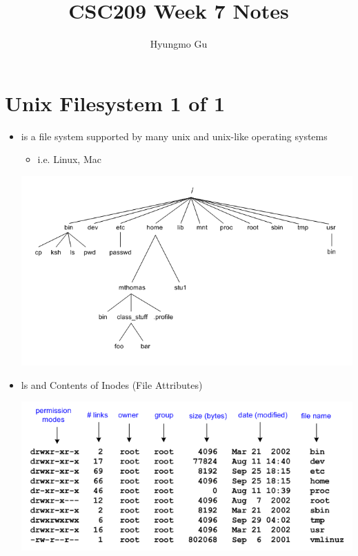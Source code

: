 \documentclass[12pt]{article}
\begin{document}
\title{CSC209 Week 7 Notes}
\author{Hyungmo Gu}
\maketitle

\section*{Unix Filesystem 1 of 1}
\begin{itemize}
    \item is a file system supported by many unix and unix-like
    operating systems
    \begin{itemize}
        \item i.e. Linux, Mac
    \end{itemize}

    \begin{center}
    \includegraphics[width=\linewidth]{images/week_7_notes_1.png}
    \end{center}
    \item ls and Contents of Inodes (File Attributes)

    \begin{center}
    \includegraphics[width=\linewidth]{images/week_7_notes_2.png}
    \end{center}


\end{itemize}
\end{document}

